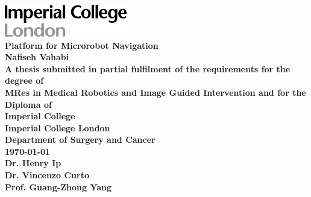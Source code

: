 \documentclass[12pt,a4paper,titlepage]{report}
\begin{document}

\begin{titlepage}
\vspace*{\fill} %
\begin{center}





\includegraphics[width=0.4\textwidth]{logo.jpg}\\[2.4cm] 




\textbf{\LARGE Platform for Microrobot Navigation} \\ [1.5cm]


\textbf{\LARGE Nafiseh Vahabi} \\ [1.3cm]


\textbf{\normalsize A thesis submitted in partial fulfilment of the requirements for the degree of } \\ [0.2cm]
\textbf{\normalsize MRes in Medical Robotics and Image Guided Intervention and for the Diploma of}\\ [0.2cm]
\textbf{\normalsize  Imperial College}\\ [2.3cm]


\textbf{\LARGE Imperial College London} \\ [0.6cm]
\textbf{\large Department of Surgery and Cancer} \\ [1.90cm]

\UKvardate
\textbf{\large \today} \\ [1.9cm]

\textbf{\large  Dr. Henry Ip} \\ [0.3cm]
\textbf{\large  Dr. Vincenzo Curto} \\ [0.3cm]
\textbf{\large Prof. Guang-Zhong Yang} \\ [1.5cm]




\end{center}
\vspace*{\fill}
\end{titlepage}
\end{document}
